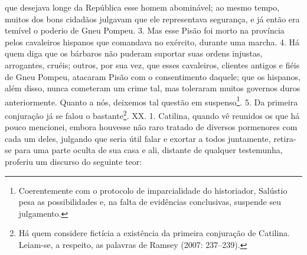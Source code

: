 que desejava longe da República esse homem abominável; ao mesmo tempo, muitos
dos bons cidadãos julgavam que ele representava segurança, e já então era
temível o poderio de Gneu Pompeu. 3. Mas esse Pisão foi morto na província
pelos cavaleiros hispanos que comandava no exército, durante uma marcha. 4. Há
quem diga que os bárbaros não puderam suportar suas ordens injustas,
arrogantes, cruéis; outros, por sua vez, que esses cavaleiros, clientes antigos
e fiéis de Gneu Pompeu, atacaram Pisão com o consentimento daquele; que os
hispanos, além disso, nunca cometeram um crime tal, mas toleraram muitos
governos duros anteriormente. Quanto a nós, deixemos tal questão em
suspenso\footnote{Coerentemente com o protocolo de imparcialidade do
historiador, Salústio pesa as possibilidades e, na falta de evidências
conclusivas, suspende seu julgamento.}. 5. Da primeira conjuração já se falou o
bastante\footnote{Há quem considere fictícia a existência da primeira
conjuração de Catilina. Leiam-se, a respeito, as palavras de Ramsey (2007: 
237--239).}.  XX. 1. Catilina, quando vê reunidos os que há pouco mencionei,
embora houvesse não raro tratado de diversos pormenores com cada um deles,
julgando que seria útil falar e exortar a todos juntamente, retira-se para uma
parte oculta de sua casa e ali, distante de qualquer testemunha, proferiu um
discurso do seguinte teor:

